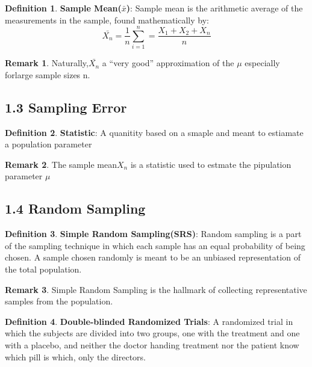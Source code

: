 \documentclass[12pt]{amsart}
\theoremstyle{definition}
\newtheorem{definition}{Definition} %
\newtheorem*{remark}{Remark}        %
\numberwithin{equation}{theorem}    %
\begin{document}
\begin{definition}
    \textbf{Sample Mean($\bar{x}$)}:
    Sample mean is the arithmetic average of the measurements in the sample, found mathematically by:
    $$\bar{X_n} =\frac{1}{n} \sum _{i=1}^{n} = \frac{X_1 + X_2 +X_n}{n}$$
    \begin{remark}
        Naturally,$\bar{X_n}$ a “very good” approximation of the $\mu$ especially forlarge sample sizes n.
    \end{remark}
\end{definition}

\subsection*{1.3 Sampling Error}

\begin{definition}
    \textbf{Statistic}:
    A quanitity based on a smaple and meant to estiamate a population parameter
    \begin{remark}
        The sample mean$X_n$ is a statistic used to estmate the pipulation parameter $\mu$
    \end{remark}
\end{definition}

\subsection*{1.4 Random Sampling}

\begin{definition}
    \textbf{Simple Random Sampling(SRS)}:
    Random sampling is a part of the sampling technique in which each sample has an equal probability of being chosen. A sample chosen randomly is meant to be an unbiased representation of the total population.

    \begin{remark}
        Simple Random Sampling is the hallmark of collecting representative samples from the population. 
    \end{remark}
\end{definition}

\begin{definition}
    \textbf{Double-blinded Randomized Trials}:
    A randomized trial in which the subjects are divided into two groups, one with the treatment and one with a placebo, and neither the doctor handing treatment nor the patient know which pill is which, only the directors.
\end{definition}
\end{document}
